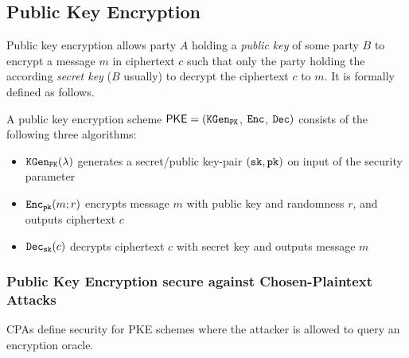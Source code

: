 

\subsection{Public Key Encryption}

Public key encryption allows party $A$ holding a \emph{public key \pk} of some party $B$ to encrypt a message $m$ in ciphertext $c$ such that only the party holding the according \emph{secret key \sk} ($B$ usually) to decrypt the ciphertext $c$ to $m$.
It is formally defined as follows.

\begin{definition}\label{def:pkencryption}
A public key encryption scheme $\mathsf{PKE}=(\mathtt{KGen_{PK}}$, $\mathtt{Enc}$, $\mathtt{Dec})$ consists of the following three algorithms:
\begin{itemize}
  \item $\mathtt{KGen_{PK}}(\lambda)$ generates a secret/public key-pair $(\mathtt{sk},\mathtt{pk})$ on input of the security parameter \secpar
  \item $\mathtt{Enc}_\mathtt{pk}(m; r)$ encrypts message $m$ with public key \pk and randomness $r$, and outputs ciphertext $c$
  \item $\mathtt{Dec}_\mathtt{sk}(c)$ decrypts ciphertext $c$ with secret key \sk and outputs message $m$ \eod
\end{itemize}
\end{definition}


\subsubsection[Chosen-Plaintext Attacks]{Public Key Encryption secure against Chosen-Plaintext Attacks}
\acp{CPA} define security for \ac{PKE} schemes where the attacker is allowed to query an encryption oracle.

